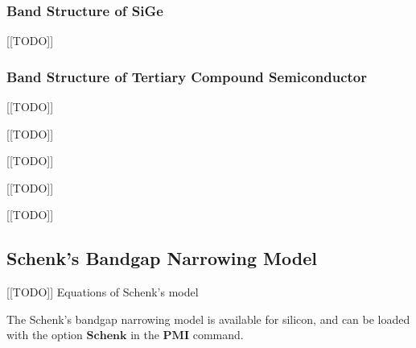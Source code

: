 \subsubsection{Band Structure of SiGe}
[[TODO]]
\par
\subsubsection{Band Structure of Tertiary Compound Semiconductor}
[[TODO]]
\par
{}[[TODO]]
\par
\par
{}[[TODO]]
\par
\par
{}[[TODO]]
\par
\par
{}[[TODO]]
\par
\par
\subsection{Schenk's Bandgap Narrowing Model}
[[TODO]] Equations of Schenk's model
\par
The Schenk's bandgap narrowing model is available for silicon, and can be loaded with the option
$\mathbf{Schenk}$ in the $\mathbf{PMI}$ command.
\par
